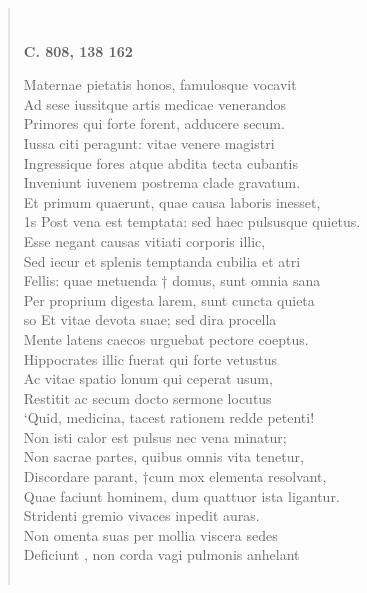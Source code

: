 \documentclass[11pt, a4paper]{report}
\begin{document}
\begin{verse}
        ﻿\pagebreak 
    \begin{center} \textbf{C. 808, 138 162} \end{center} \marginpar{[291]} Maternae pietatis honos, famulosque vocavit \\ Ad sese iussitque artis medicae  \lbrack venerandos \rbrack  \\ Primores qui forte forent, adducere secum. \\ Iussa citi peragunt: vitae venere magistri \\ Ingressique fores atque abdita tecta cubantis \\ Inveniunt iuvenem postrema clade gravatum. \\ Et primum quaerunt, quae causa laboris inesset, \\ 1s Post vena  \lbrack est \rbrack  temptata: sed haec pulsusque quietus. \\ Esse negant causas vitiati corporis illic, \\ Sed iecur et splenis temptanda cubilia et atri \\ Fellis: quae metuenda † domus, sunt omnia sana \\ Per proprium digesta larem, sunt cuncta quieta \\ so Et vitae devota suae; sed dira procella \\ Mente latens caecos urguebat pectore coeptus. \\ Hippocrates illic fuerat qui forte vetustus \\ Ac vitae spatio lonum qui ceperat usum, \\ Restitit ac secum docto sermone locutus \\ ‘Quid, medicina, tacest rationem redde petenti! \\ Non isti calor est pulsus nec vena minatur; \\ Non sacrae partes, quibus omnis vita tenetur, \\ Discordare parant, †cum mox elementa resolvant, \\ Quae faciunt hominem, dum quattuor ista ligantur. \\ Stridenti gremio vivaces inpedit auras. \\ Non omenta suas per mollia viscera sedes \\  \lbrack Deficiunt \rbrack , non corda vagi pulmonis anhelant \\ 
        ﻿\pagebreak 

\end{verse}
\end{document}
